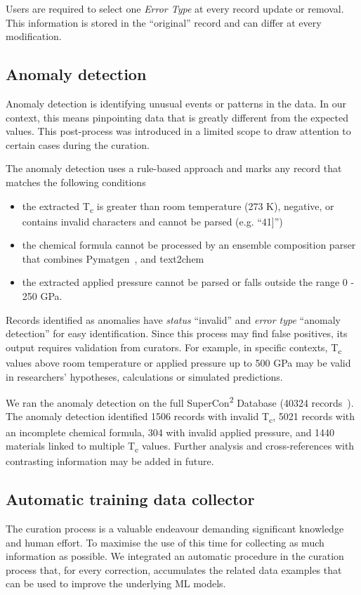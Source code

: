 Users are required to select one \emph{Error Type} at every record update or removal. 
This information is stored in the ``original'' record and can differ at every modification.


\subsection{Anomaly detection}
\label{subsec:anomaly-detection}
Anomaly detection is identifying unusual events or patterns in the data. 
In our context, this means pinpointing data that is greatly different from the expected values.
This post-process was introduced in a limited scope to draw attention to certain cases during the curation.

The anomaly detection uses a rule-based approach and marks any record that matches the following conditions
\begin{itemize}
    \item the extracted T\textsubscript{c} is greater than room temperature (273 K), negative, or contains invalid characters and cannot be parsed (e.g. ``41]'')
    \item the chemical formula cannot be processed by an ensemble composition parser that combines Pymatgen~\cite{Ong2013}, and text2chem~\cite{kononova2019text} 
    \item the extracted applied pressure cannot be parsed or falls outside the range 0 - 250 GPa.
\end{itemize}

Records identified as anomalies have \emph{status} ``invalid'' and \emph{error type} ``anomaly detection'' for easy identification.
Since this process may find false positives, its output requires validation from curators. 
For example, in specific contexts, T\textsubscript{c} values above room temperature or applied pressure up to 500 GPa may be valid in researchers' hypotheses, calculations or simulated predictions. 

We ran the anomaly detection on the full SuperCon\textsuperscript{2} Database (40324 records~\cite{foppiano2023automatic}). 
The anomaly detection identified 1506 records with invalid T\textsubscript{c}, 5021 records with an incomplete chemical formula, 304 with invalid applied pressure, and 1440 materials linked to multiple T\textsubscript{c} values. 
Further analysis and cross-references with contrasting information may be added in future. 

\subsection{Automatic training data collector}
\label{subsec:feedback-loop-training-data}
The curation process is a valuable endeavour demanding significant knowledge and human effort. 
To maximise the use of this time for collecting as much information as possible.
We integrated an automatic procedure in the curation process that, for every correction, accumulates the related data examples that can be used to improve the underlying ML models. 

